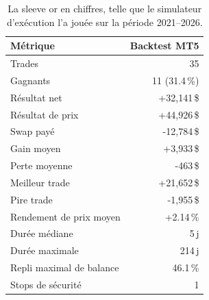 \begin{table}[H]
\centering
\begin{tabular}{@{}lr@{}}
\toprule
\textbf{Métrique} & \textbf{Backtest MT5} \\
\midrule
Trades & 35 \\
Gagnants & 11 (31.4\,\%) \\
Résultat net & +32,141\,\$ \\
Résultat de prix & +44,926\,\$ \\
Swap payé & -12,784\,\$ \\
Gain moyen & +3,933\,\$ \\
Perte moyenne & -463\,\$ \\
Meilleur trade & +21,652\,\$ \\
Pire trade & -1,955\,\$ \\
Rendement de prix moyen & +2.14\,\% \\
Durée médiane & 5\,j \\
Durée maximale & 214\,j \\
Repli maximal de balance & 46.1\,\% \\
Stops de sécurité & 1 \\
\bottomrule
\end{tabular}
\caption{La sleeve or en chiffres, telle que le simulateur d'exécution l'a jouée sur la période 2021--2026.}
\end{table}
